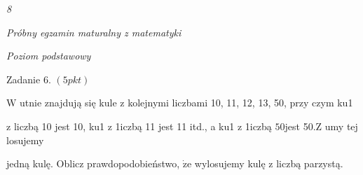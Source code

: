 \documentclass[a4paper,12pt]{article}
\begin{document}
{\it 8}

{\it Próbny egzamin maturalny z matematyki}

{\it Poziom podstawowy}

Zadanie 6. $(5pkt)$

$\mathrm{W}$ utnie znajdują się kule z kolejnymi liczbami 10, 11, 12, 13, 50, przy czym ku1

z liczbą 10 jest 10, ku1 z 1iczbą 11 jest 11 itd., a ku1 z 1iczbą $50$jest 5$0. \mathrm{Z}$ umy tej losujemy

jedną kulę. Oblicz prawdopodobieństwo, $\dot{\mathrm{z}}\mathrm{e}$ wylosujemy kulę z liczbą parzystą.
\end{document}

